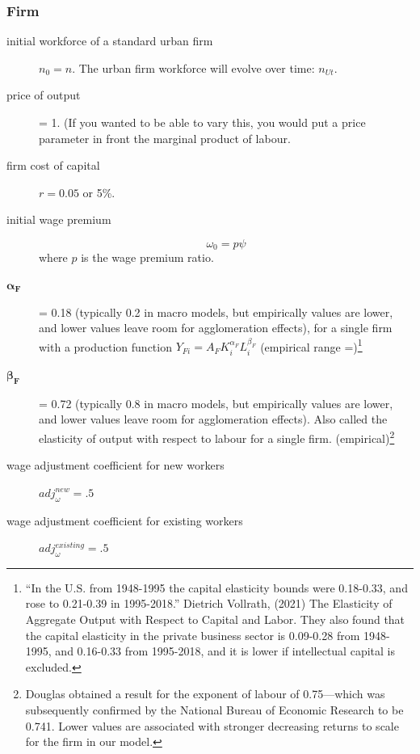 \subsubsection{Firm}
\begin{description}
\item [initial workforce of a standard urban firm] $n_0=n$.  The urban firm workforce will evolve over time: $n_{Ut}$. 

\item [price of output] = 1. (If you wanted to be able to vary this, you would put a price parameter in front the %
\gls{marginal product of labour}. %

\item [firm cost of capital] $r = 0.05$ or 5\%.

\item [initial wage premium]  \[\omega_0 = p \psi\] where $p$ is the wage premium ratio.

\item  [$\mathbf{\alpha_F}$] = 0.18 (typically 0.2 in macro models, but empirically values are lower, and lower values leave room for agglomeration effects),  for a single firm with a production function $Y_{Fi}=A_F K_i^{\alpha_F }L^{\beta_F}_i$ (empirical range =)\footnote{``In the U.S. from 1948-1995 the capital elasticity bounds were 0.18-0.33, and rose to 0.21-0.39 in 1995-2018.'' Dietrich Vollrath, (2021) The Elasticity of Aggregate Output with Respect to Capital and Labor. They also found that the capital elasticity in the private business sector is 0.09-0.28 from 1948-1995, and 0.16-0.33 from 1995-2018, and it is lower if intellectual capital is excluded.}

\item  [$\mathbf{\beta_F}$] = 0.72 (typically 0.8 in macro models, but empirically values are lower, and lower values leave room for agglomeration effects). Also called the elasticity of output with respect to labour for a single firm. (empirical)\footnote{Douglas  obtained a result for the exponent of labour of 0.75—which was subsequently confirmed by the National Bureau of Economic Research to be 0.741. Lower values  are associated with stronger decreasing returns to scale for the firm in our model.} 

\item [wage adjustment coefficient for new workers ] $adj^{new}_\omega=.5$

\item [wage adjustment coefficient for existing workers] $adj^{existing}_\omega=.5$
\end{description}

